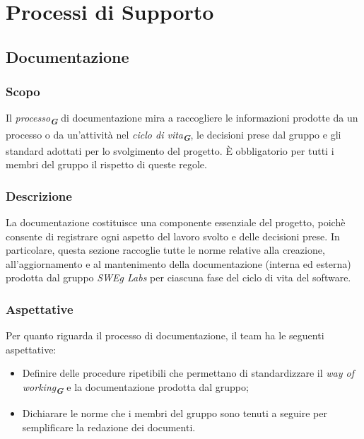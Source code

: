 

\section{Processi di Supporto}


\subsection{Documentazione}
\label{sec:documentazione}

\subsubsection{Scopo}
Il \emph{processo}\textsubscript{\textit{\textbf{G}}} di documentazione mira a raccogliere le informazioni prodotte da un processo o
da un’attività nel \emph{ciclo di vita}\textsubscript{\textit{\textbf{G}}}, le decisioni prese dal gruppo e gli standard adottati per lo
svolgimento del progetto. È obbligatorio per tutti i membri del gruppo il rispetto di queste regole.

\subsubsection{Descrizione}
La documentazione costituisce una componente essenziale del progetto, poichè consente di
registrare ogni aspetto del lavoro svolto e delle decisioni prese. In particolare, questa sezione
raccoglie tutte le norme relative alla creazione, all’aggiornamento e al mantenimento della
documentazione (interna ed esterna) prodotta dal gruppo \emph{SWEg Labs} per ciascuna fase del
ciclo di vita del software.

\subsubsection{Aspettative}
Per quanto riguarda il processo di documentazione, il team ha le seguenti aspettative:
\begin{itemize}
    \item Definire delle procedure ripetibili che permettano di standardizzare il \emph{way of working}\textsubscript{\textit{\textbf{G}}}
    e la documentazione prodotta dal gruppo;
    \item Dichiarare le norme che i membri del gruppo sono tenuti a seguire per semplificare la
    redazione dei documenti.
\end{itemize}

